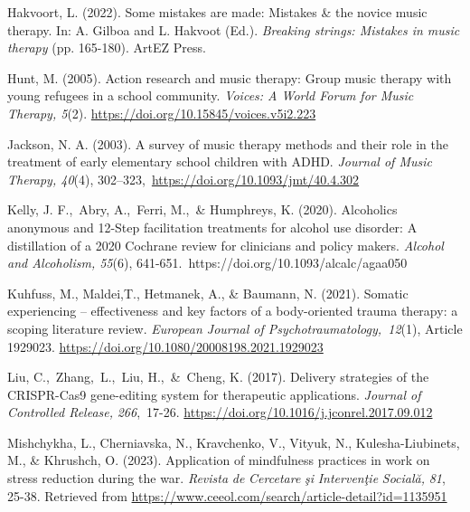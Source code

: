 \documentclass[authordate, empirical, issue]{jote-new-article}
\begin{document}
Hakvoort, L. (2022). Some mistakes are made: Mistakes \& the novice music therapy. In: A. Gilboa and L. Hakvoot (Ed.). \emph{Breaking strings: Mistakes in music therapy} (pp. 165-180). ArtEZ Press.



Hunt, M. (2005). Action research and music therapy: Group music therapy with young refugees in a school community. \emph{Voices: A World Forum for Music Therapy, 5}(2). \href{https://doi.org/10.15845/voices.v5i2.223}{https://doi.org/10.15845/voices.v5i2.223}



Jackson, N. A. (2003). A survey of music therapy methods and their role in the treatment of early elementary school children with ADHD. \emph{Journal of Music Therapy, 40}(4), 302--323, \href{https://doi.org/10.1093/jmt/40.4.302}{https://doi.org/10.1093/jmt/40.4.302}



Kelly, J. F., Abry, A., Ferri, M., \& Humphreys, K. (2020). Alcoholics anonymous and 12-Step facilitation treatments for alcohol use disorder: A distillation of a 2020 Cochrane review for clinicians and policy makers. \emph{Alcohol and Alcoholism, 55}(6), 641-651. https://doi.org/10.1093/alcalc/agaa050



Kuhfuss, M., Maldei,T., Hetmanek, A., \& Baumann, N. (2021). Somatic experiencing -- effectiveness and key factors of a body-oriented trauma therapy: a scoping literature review. \emph{European Journal of Psychotraumatology\emph{,}\emph{ }}\emph{12}(1), Article 1929023. \href{https://doi.org/10.1080/20008198.2021.1929023}{https://doi.org/10.1080/20008198.2021.1929023}



Liu, C., Zhang, L., Liu, H., \& Cheng, K. (2017). Delivery strategies of the CRISPR-Cas9 gene-editing system for therapeutic applications. \emph{Journal of Controlled Release}\emph{,}\emph{ 266}, 17-26. \href{https://doi.org/10.1016/j.jconrel.2017.09.012}{https://doi.org/10.1016/j.jconrel.2017.09.012}



Mishchykha, L., Cherniavska, N., Kravchenko, V., Vityuk, N., Kulesha-Liubinets, M., \& Khrushch, O. (2023). Application of mindfulness practices in work on stress reduction during the war. \emph{Revista}\emph{ de }\emph{Cercetare}\emph{ }\emph{şi}\emph{ }\emph{Intervenţie}\emph{ }\emph{Socială}\emph{,} \emph{81}, 25-38. Retrieved from \href{https://www.ceeol.com/search/article-detail?id=1135951}{https://www.ceeol.com/search/article-detail?id=1135951}
\end{document}
